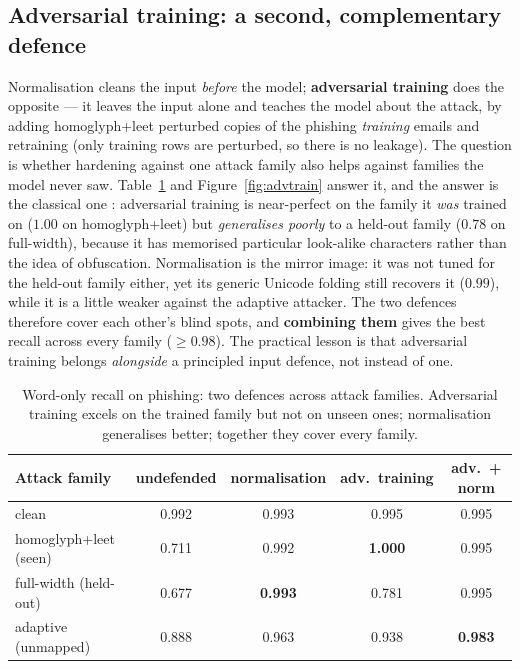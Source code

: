 \documentclass[11pt]{article}
\begin{document}
\subsection{Adversarial training: a second, complementary defence}
\label{sec:advtrain}
Normalisation cleans the input \emph{before} the model; \textbf{adversarial training}
does the opposite --- it leaves the input alone and teaches the model about the
attack, by adding homoglyph+leet perturbed copies of the phishing \emph{training}
emails and retraining (only training rows are perturbed, so there is no leakage). The
question is whether hardening against one attack family also helps against families
the model never saw. Table~\ref{tab:advtrain} and Figure~\ref{fig:advtrain} answer it,
and the answer is the classical one \citep{goodfellow2015explaining}: adversarial
training is near-perfect on the family it \emph{was} trained on ($1.00$ on
homoglyph+leet) but \emph{generalises poorly} to a held-out family ($0.78$ on
full-width), because it has memorised particular look-alike characters rather than the
idea of obfuscation. Normalisation is the mirror image: it was not tuned for the
held-out family either, yet its generic Unicode folding still recovers it ($0.99$),
while it is a little weaker against the adaptive attacker. The two defences therefore
cover each other's blind spots, and \textbf{combining them} gives the best recall
across every family ($\ge 0.98$). The practical lesson is that adversarial training
belongs \emph{alongside} a principled input defence, not instead of one.

\begin{table}[t]
\centering
\caption{Word-only recall on phishing: two defences across attack families.
Adversarial training excels on the trained family but not on unseen ones;
normalisation generalises better; together they cover every family.}
\label{tab:advtrain}
\begin{tabular}{lcccc}
\toprule
Attack family & undefended & normalisation & adv.\ training & adv.\ + norm \\
\midrule
clean                  & 0.992 & 0.993 & 0.995 & 0.995 \\
homoglyph+leet (seen)  & 0.711 & 0.992 & \textbf{1.000} & 0.995 \\
full-width (held-out)  & 0.677 & \textbf{0.993} & 0.781 & 0.995 \\
adaptive (unmapped)    & 0.888 & 0.963 & 0.938 & \textbf{0.983} \\
\bottomrule
\end{tabular}
\end{table}
\end{document}
